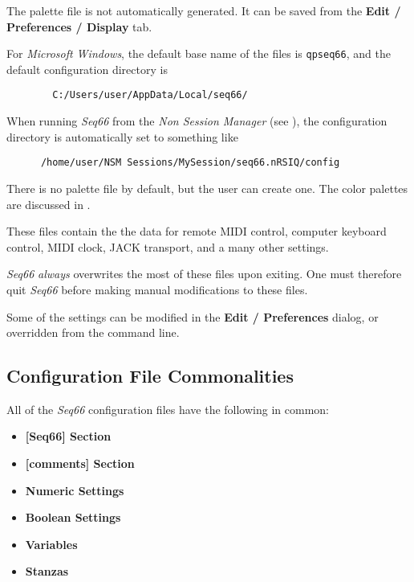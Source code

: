    The palette file is not automatically generated.  It can be saved from the
   \textbf{Edit / Preferences / Display} tab.

   For \textsl{Microsoft Windows}, the default base name of the files is
   \texttt{qpseq66}, and the default configuration directory is

   \begin{verbatim}
        C:/Users/user/AppData/Local/seq66/
   \end{verbatim}

   When running \textsl{Seq66} from the \textsl{Non Session Manager}
   (see ),
   the configuration directory is automatically set to something like

   \begin{verbatim}
      /home/user/NSM Sessions/MySession/seq66.nRSIQ/config
   \end{verbatim}

   There is no palette file by default, but the user can create one.
   The color palettes are discussed in .

   These files contain the the data for remote MIDI control, computer keyboard
   control, MIDI clock, JACK transport, and a many other settings.

   \textsl{Seq66} \textsl{always} overwrites the most of these files upon
   exiting.  One must therefore quit \textsl{Seq66} before making
   manual modifications to these files.

   Some of the settings can be modified in the \textbf{Edit / Preferences}
   dialog, or overridden from the command line.

\subsection{Configuration File Commonalities}
\label{subsec:configuration_file_commonalities}

   All of the \textsl{Seq66} configuration files have the following in common:

   \begin{itemize}
      \item \textbf{[Seq66] Section}
      \item \textbf{[comments] Section}
      \item \textbf{Numeric Settings}
      \item \textbf{Boolean Settings}
      \item \textbf{Variables}
      \item \textbf{Stanzas}
   \end{itemize}

